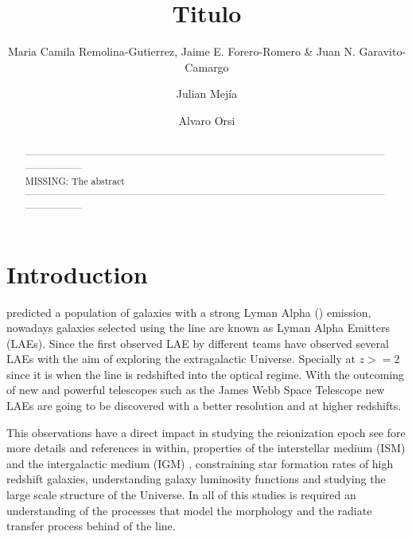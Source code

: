 \documentclass{latex/emulateapj}
\begin{document}
\title{Titulo}


\author{Maria Camila Remolina-Gutierrez, Jaime E. Forero-Romero \&
  Juan N. Garavito-Camargo} 
\author{Julian Mej\'ia}
\author{Alvaro Orsi}


\begin{abstract}
\noindent ------------------------------------------------------------------------------------------------------------------------------------\\
MISSING: The abstract\\
------------------------------------------------------------------------------------------------------------------------------------\\
\end{abstract}

\section{Introduction}
\label{sec:intro}

\cite{PartridgePeebles} predicted a population of galaxies with a strong 
Lyman Alpha (\lya) emission,  nowadays galaxies selected using the \lya 
line are known as Lyman Alpha Emitters (LAEs). Since the first 
observed LAE by \cite{DjorgovskiThompson} different teams have 
observed several LAEs \cite{Rhoads00,Gawiser2007,Koehler2007,Ouchi08,Yamada2012,Schenker2012,Kulas12, Yamada2012, Chonis2013,Finkelstein2013,Ostlin14} 
with the aim of exploring the extragalactic Universe.  Specially at $z>=2$ since it is when
the  line is redshifted into the optical regime. With the outcoming of
new and powerful telescopes such as the James Webb Space Telescope
new LAEs are going to be discovered with a better resolution and at
higher redshifts. 
  
This observations have a direct impact in studying the reionization epoch
see \cite{review} fore more details and references in within,
properties of the interstellar medium (ISM) and the intergalactic medium (IGM)
\citep{Behrens13} \citep{DijkstraKramer}, constraining star formation 
rates of high redshift galaxies, understanding galaxy luminosity functions \cite{Max} and
studying the large scale structure of the Universe. In all of this
studies is required an understanding of the processes 
that model the morphology and the radiate transfer process 
behind  of the \lya line. 
\end{document}
